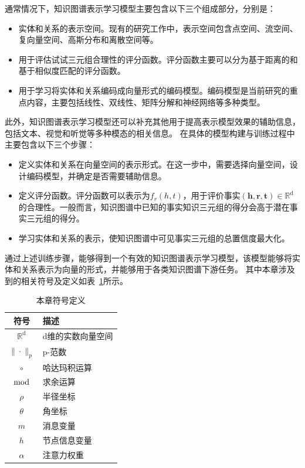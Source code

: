 \documentclass[algorithmlist, AutoFakeBold, AutoFakeSlant, figurelist, tablelist, nomlist, masters]{seuthesix}
\begin{document}
通常情况下，知识图谱表示学习模型主要包含以下三个组成部分，分别是：
\begin{itemize}
  \item [1.] 实体和关系的表示空间。现有的研究工作中，表示空间包含点空间、流空间、复向量空间、高斯分布和离散空间等。
  \item [2.] 用于评估试试三元组合理性的评分函数。评分函数主要可以分为基于距离的和基于相似度匹配的评分函数。
  \item [3.] 用于学习将实体和关系编码成向量形式的编码模型。编码模型是当前研究的重点内容，主要包括线性、双线性、矩阵分解和神经网络等多种类型。
\end{itemize}

此外，知识图谱表示学习模型还可以补充其他用于提高表示模型效果的辅助信息，包括文本、视觉和听觉等多种模态的相关信息。
在具体的模型构建与训练过程中主要包含以下三个步骤：
\begin{itemize}
  \item [1.] 定义实体和关系在向量空间的表示形式。在这一步中，需要选择向量空间，设计编码模型，并确定是否需要辅助信息。
  \item [2.] 定义评分函数。评分函数可以表示为$f_r(h, t)$，用于评价事实$\left(\bm{h}, \bm{r}, \bm{t}\right) \in \mathbb{R}^{\mathrm{d}}$的合理性。一般而言，知识图谱中已知的事实知识三元组的得分会高于潜在事实三元组的得分。
  \item [3.] 学习实体和关系的表示，使知识图谱中可见事实三元组的总置信度最大化。
\end{itemize}

通过上述训练步骤，能够得到一个有效的知识图谱表示学习模型，该模型能够将实体和关系表示为向量的形式，并能够用于各类知识图谱下游任务。
其中本章涉及到的相关符号及定义如表~\ref{2_symbols}所示。
\begin{table}
  \centering
  \begin{tabular*}{0.4\textwidth}{@{\extracolsep{\fill}}cl}
		\toprule[1pt]
    符号 & 描述 \\ \hline
    $\mathbb{R}^{\mathrm{d}}$ & d维的实数向量空间\\
    $\|\cdot\|_{p}$ & p-范数\\
    $\circ$ & 哈达玛积运算\\
    $\bmod$ & 求余运算\\
    $\rho$ & 半径坐标\\
    $\theta$ & 角坐标\\
    $m$ & 消息变量\\
    $h$ & 节点信息变量\\
    $\alpha$ & 注意力权重\\
		\bottomrule[1pt]
	\end{tabular*}
  \caption{本章符号定义}
  \label{2_symbols}
\end{table}
\end{document}
